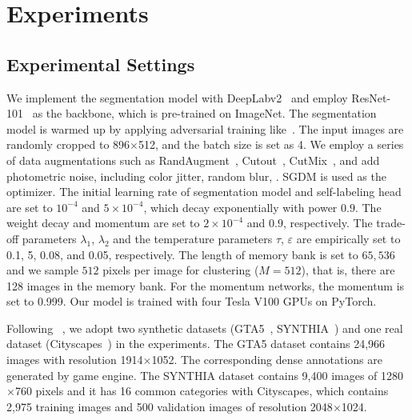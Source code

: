 \documentclass[10pt,twocolumn,letterpaper]{article}
\begin{document}
	\section{Experiments}
	\subsection{Experimental Settings}
	We implement the segmentation model with DeepLabv2~\cite{chen2017deeplab} and employ  ResNet-101~\cite{he2016deep} as the backbone, which is pre-trained on ImageNet. The segmentation model is warmed up by applying adversarial training like~\cite{tsai2018learning}.
	The input images are randomly cropped to 896$\times$512, and the batch size is set as 4. We employ a series of data augmentations such as RandAugment~\cite{cubuk2020randaugment}, Cutout~\cite{devries2017improved}, CutMix~\cite{yun2019cutmix}, and add photometric noise, including color jitter, random blur, \etc. SGDM is used as the optimizer. The initial learning rate of segmentation model and self-labeling head are set to $10^{-4}$ and $5\times 10^{-4}$, which decay exponentially with power $0.9$. The weight decay and momentum are set to $2\times 10^{-4}$ and $0.9$, respectively. The trade-off parameters $\lambda_1$, $\lambda_2$ and the temperature parameters $\tau$, $\varepsilon$  are empirically set to 0.1, 5, 0.08, and 0.05, respectively. The length of memory bank is set to $65,536$ and we sample $512$ pixels per image for clustering ($M=512$), that is, there are 128 images in the memory bank. For the momentum networks, the momentum is set to 0.999. Our model is trained with four Tesla V100 GPUs on PyTorch. 


	 Following ~\cite{zhang2019category,zhang2017curriculum,mei2020instance}, we adopt two synthetic datasets (GTA5~\cite{richter2016playing}, SYNTHIA~\cite{ros2016synthia}) and one real dataset (Cityscapes~\cite{cordts2016cityscapes}) in the experiments. The GTA5 dataset contains 24,966 images with resolution 1914$\times$1052. The corresponding dense annotations are generated by game engine. The SYNTHIA dataset contains 9,400 images of 1280$\times$760 pixels and it has 16 common categories with Cityscapes, which contains 2,975 training images and 500 validation images of resolution 2048$\times$1024. 
\end{document}
